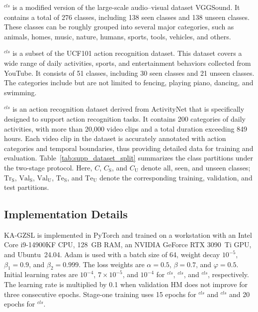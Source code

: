 \documentclass[10pt,journal,twoside]{IEEEtran}
\begin{document}
\textbf{}$^{\textit{cls}}$ is a modified version of the large-scale audio--visual dataset VGGSound. It contains a total of 276 classes, including 138 seen classes and 138 unseen classes. These classes can be roughly grouped into several major categories, such as animals, homes, music, nature, humans, sports, tools, vehicles, and others.

\textbf{}$^{\textit{cls}}$ is a subset of the UCF101 action recognition dataset. This dataset covers a wide range of daily activities, sports, and entertainment behaviors collected from YouTube. It consists of 51 classes, including 30 seen classes and 21 unseen classes. The categories include but are not limited to fencing, playing piano, dancing, and swimming.

\textbf{}$^{\textit{cls}}$ is an action recognition dataset derived from ActivityNet that is specifically designed to support action recognition tasks. It contains 200 categories of daily activities, with more than 20,000 video clips and a total duration exceeding 849 hours. Each video clip in the dataset is accurately annotated with action categories and temporal boundaries, thus providing detailed data for training and evaluation.
Table~\ref{tab:supp_dataset_split} summarizes the class partitions under the two-stage protocol. Here, $C$, $C_\text{S}$, and $C_\text{U}$ denote all, seen, and unseen classes; $\text{Tr}_\text{S}$, $\text{Val}_\text{S}$, $\text{Val}_\text{U}$, $\text{Te}_\text{S}$, and $\text{Te}_\text{U}$ denote the corresponding training, validation, and test partitions.

\subsection{Implementation Details}

KA-GZSL is implemented in PyTorch and trained on a workstation with an Intel Core i9-14900KF CPU, 128~GB RAM, an NVIDIA GeForce RTX 3090~Ti GPU, and Ubuntu~24.04. Adam is used with a batch size of 64, weight decay $10^{-5}$, $\beta_1=0.9$, and $\beta_2=0.999$. The loss weights are $\alpha=0.5$, $\beta=0.7$, and $\varphi=0.5$. Initial learning rates are $10^{-4}$, $7\times10^{-5}$, and $10^{-4}$ for $^{\textit{cls}}$, $^{\textit{cls}}$, and $^{\textit{cls}}$, respectively. The learning rate is multiplied by 0.1 when validation HM does not improve for three consecutive epochs. Stage-one training uses 15 epochs for $^{\textit{cls}}$ and $^{\textit{cls}}$ and 20 epochs for $^{\textit{cls}}$.
\end{document}
